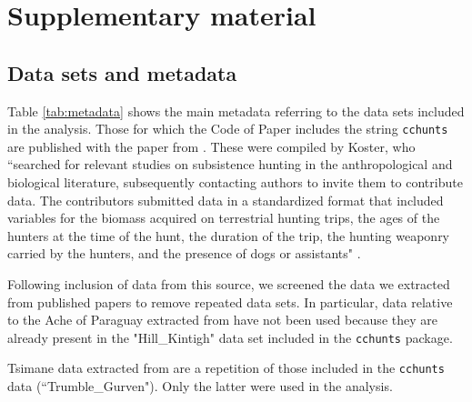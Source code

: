 \section{Supplementary material}
\subsection{Data sets and metadata}
Table \ref{tab:metadata} shows the main metadata referring to the data sets included in the analysis. Those for which the Code of Paper includes the string \texttt{cchunts} are published with the paper from \citet{koster_life_2020}. These were compiled by Koster, who ``searched for relevant studies on subsistence hunting in the anthropological and biological literature, subsequently contacting authors to invite them to contribute data. The contributors submitted data in a standardized format that included variables for the biomass acquired on terrestrial hunting trips, the ages of the hunters at the time of the hunt, the duration of the trip, the hunting weaponry carried by the hunters, and the presence of dogs or assistants" \citep{koster_life_2020}.

Following inclusion of data from this source, we screened the data we extracted from published papers to remove repeated data sets. In particular, data relative to the Ache of Paraguay extracted from \citet{walker_age-dependency_2002} have not been used because they are already present in the "Hill\_Kintigh" data set included in the \texttt{cchunts} package. 

Tsimane data extracted from \citet{gurven_how_2006} are a repetition of those included in the \texttt{cchunts} data (``Trumble\_Gurven"). Only the latter were used in the analysis.



